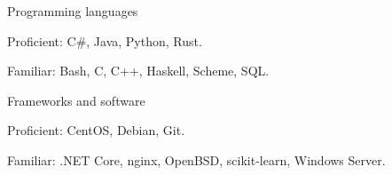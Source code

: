 
\begin{cventries}
  \cventry
    {} %
    {Programming languages} %
    {}
    {}
    {
      \begin{cvitems} %
         \item {Proficient: C\#, Java, Python, Rust.}
         \vspace{0.5mm}
         \item {Familiar: Bash, C, C++, Haskell, Scheme, SQL.}
      \end{cvitems}
    }
    
  \cventry
    {} %
    {Frameworks and software} %
    {}
    {}
    {
      \begin{cvitems} %
         \item {Proficient: CentOS, Debian, Git.}
         \vspace{0.5mm}
         \item {Familiar: .NET Core, nginx, OpenBSD, scikit-learn, Windows Server.}
      \end{cvitems}
    }
\end{cventries}
